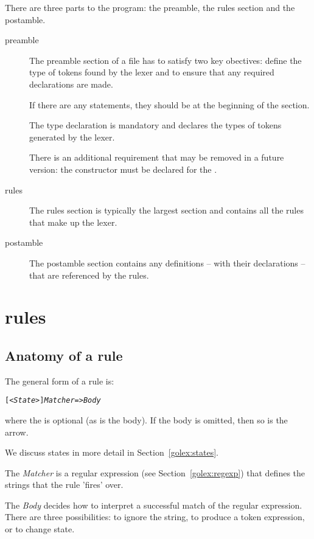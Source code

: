 There are three parts to the \golex program: the preamble, the rules section and the postamble.
\begin{description}
\item[preamble]
The preamble section of a \golex file has to satisfy two key obectives: define the type of tokens found by the lexer and to ensure that any required  declarations are made.

If there are any  statements, they should be at the beginning of the section.

The  type declaration is mandatory and declares the types of tokens generated by the lexer. 

\begin{aside}
There is an additional requirement that may be removed in a future version: the constructor  must be declared for the .
\end{aside}

\item[rules]
The rules section is typically the largest section and contains all the rules that make up the lexer.

\item[postamble]
The postamble section contains any definitions -- with their declarations -- that are referenced by the rules.
\end{description}

\section{\golex rules}
\label{golex:rules}

\subsection{Anatomy of a rule}

The general form of a \golex rule is:
\begin{alltt}
[\emph{<State>}] \emph{Matcher} => \emph{Body}
\end{alltt}
where the  is optional (as is the body). If the body is omitted, then so is the arrow.

We discuss states in more detail in Section~\vref{golex:states}.

The \emph{Matcher} is a regular expression (see Section~\vref{golex:regexp}) that defines the strings that the rule 'fires' over.

The \emph{Body} decides how to interpret a successful match of the regular expression. There are three possibilities: to ignore the string, to produce a token expression, or to change state.

